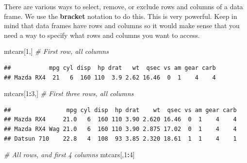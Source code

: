 \documentclass[]{book}
\newenvironment{Shaded}{\begin{snugshade}}{\end{snugshade}}
\newcommand{\CommentTok}[1]{\textcolor[rgb]{0.56,0.35,0.01}{\textit{#1}}}
\newcommand{\DecValTok}[1]{\textcolor[rgb]{0.00,0.00,0.81}{#1}}
\newcommand{\NormalTok}[1]{#1}
\newcommand{\OperatorTok}[1]{\textcolor[rgb]{0.81,0.36,0.00}{\textbf{#1}}}
\begin{document}
There are various ways to select, remove, or exclude rows and columns of a data frame. We use the \textbf{bracket} notation to do this. This is very powerful. Keep in mind that data frames have rows and columns so it would make sense that you need a way to specify what rows and columns you want to access.

\begin{Shaded}
\begin{Highlighting}[]
\NormalTok{mtcars[}\DecValTok{1}\NormalTok{,]     }\CommentTok{# First row, all columns}
\end{Highlighting}
\end{Shaded}

\begin{verbatim}
##           mpg cyl disp  hp drat   wt  qsec vs am gear carb
## Mazda RX4  21   6  160 110  3.9 2.62 16.46  0  1    4    4
\end{verbatim}

\begin{Shaded}
\begin{Highlighting}[]
\NormalTok{mtcars[}\DecValTok{1}\OperatorTok{:}\DecValTok{3}\NormalTok{,]   }\CommentTok{# First three rows, all columns}
\end{Highlighting}
\end{Shaded}

\begin{verbatim}
##                mpg cyl disp  hp drat    wt  qsec vs am gear carb
## Mazda RX4     21.0   6  160 110 3.90 2.620 16.46  0  1    4    4
## Mazda RX4 Wag 21.0   6  160 110 3.90 2.875 17.02  0  1    4    4
## Datsun 710    22.8   4  108  93 3.85 2.320 18.61  1  1    4    1
\end{verbatim}

\begin{Shaded}
\begin{Highlighting}[]
\CommentTok{# All rows, and first 4 columns}
\NormalTok{mtcars[,}\DecValTok{1}\OperatorTok{:}\DecValTok{4}\NormalTok{]   }
\end{Highlighting}
\end{Shaded}
\end{document}
